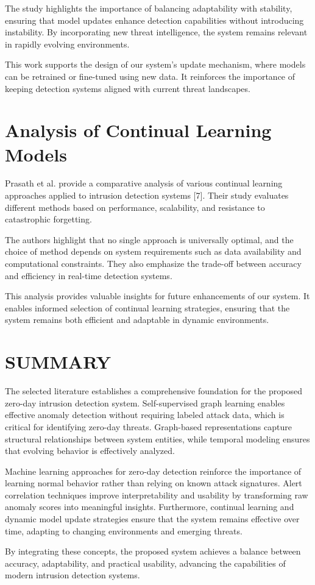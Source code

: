 The study highlights the importance of balancing adaptability with stability,
ensuring that model updates enhance detection capabilities without introducing
instability. By incorporating new threat intelligence, the system remains
relevant in rapidly evolving environments.

This work supports the design of our system’s update mechanism, where models can
be retrained or fine-tuned using new data. It reinforces the importance of
keeping detection systems aligned with current threat landscapes.

\section{Analysis of Continual Learning Models}
Prasath et al. provide a comparative analysis of various continual learning
approaches applied to intrusion detection systems [7]. Their study evaluates
different methods based on performance, scalability, and resistance to
catastrophic forgetting.

The authors highlight that no single approach is universally optimal, and the
choice of method depends on system requirements such as data availability and
computational constraints. They also emphasize the trade-off between accuracy
and efficiency in real-time detection systems.

This analysis provides valuable insights for future enhancements of our system.
It enables informed selection of continual learning strategies, ensuring that
the system remains both efficient and adaptable in dynamic environments.

\section{SUMMARY}
The selected literature establishes a comprehensive foundation for the proposed
zero-day intrusion detection system. Self-supervised graph learning enables
effective anomaly detection without requiring labeled attack data, which is
critical for identifying zero-day threats. Graph-based representations capture
structural relationships between system entities, while temporal modeling ensures
that evolving behavior is effectively analyzed.

Machine learning approaches for zero-day detection reinforce the importance of
learning normal behavior rather than relying on known attack signatures. Alert
correlation techniques improve interpretability and usability by transforming
raw anomaly scores into meaningful insights. Furthermore, continual learning and
dynamic model update strategies ensure that the system remains effective over
time, adapting to changing environments and emerging threats.

By integrating these concepts, the proposed system achieves a balance between
accuracy, adaptability, and practical usability, advancing the capabilities of
modern intrusion detection systems.